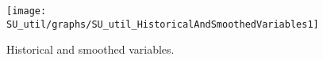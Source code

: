  
\begin{figure}[H]
\centering 
\texttt{[image: SU\_util/graphs/SU\_util\_HistoricalAndSmoothedVariables1]}
\caption{Historical and smoothed variables.}\label{Fig:HistoricalAndSmoothedVariables:1}
\end{figure}


